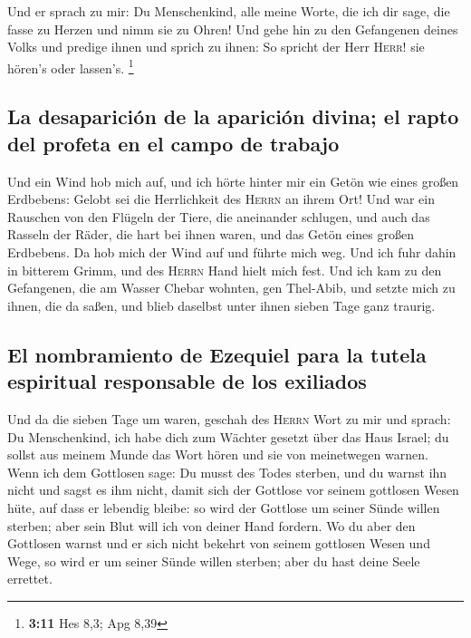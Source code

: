  Und er sprach zu mir: Du Menschenkind, alle meine Worte,
die ich dir sage, die fasse zu Herzen und nimm sie zu Ohren!
 Und gehe hin zu den Gefangenen deines Volks und predige
ihnen und sprich zu ihnen: So spricht der Herr \textsc{Herr}! sie
hören's oder lassen's. \footnote{\textbf{3:11} Hes 8,3; Apg 8,39}

\hypertarget{la-desapariciuxf3n-de-la-apariciuxf3n-divina-el-rapto-del-profeta-en-el-campo-de-trabajo}{%
\subsection{La desaparición de la aparición divina; el rapto del profeta
en el campo de
trabajo}\label{la-desapariciuxf3n-de-la-apariciuxf3n-divina-el-rapto-del-profeta-en-el-campo-de-trabajo}}

 Und ein Wind hob mich auf, und ich hörte hinter mir ein
Getön wie eines großen Erdbebens: Gelobt sei die Herrlichkeit des
\textsc{Herrn} an ihrem Ort!  Und war ein Rauschen von
den Flügeln der Tiere, die aneinander schlugen, und auch das Rasseln der
Räder, die hart bei ihnen waren, und das Getön eines großen Erdbebens.
 Da hob mich der Wind auf und führte mich weg. Und ich
fuhr dahin in bitterem Grimm, und des \textsc{Herrn} Hand hielt mich
fest.  Und ich kam zu den Gefangenen, die am Wasser
Chebar wohnten, gen Thel-Abib, und setzte mich zu ihnen, die da saßen,
und blieb daselbst unter ihnen sieben Tage ganz traurig.

\hypertarget{el-nombramiento-de-ezequiel-para-la-tutela-espiritual-responsable-de-los-exiliados}{%
\subsection{El nombramiento de Ezequiel para la tutela espiritual
responsable de los
exiliados}\label{el-nombramiento-de-ezequiel-para-la-tutela-espiritual-responsable-de-los-exiliados}}

 Und da die sieben Tage um waren, geschah des
\textsc{Herrn} Wort zu mir und sprach:  Du Menschenkind,
ich habe dich zum Wächter gesetzt über das Haus Israel; du sollst aus
meinem Munde das Wort hören und sie von meinetwegen warnen.
 Wenn ich dem Gottlosen sage: Du musst des Todes sterben,
und du warnst ihn nicht und sagst es ihm nicht, damit sich der Gottlose
vor seinem gottlosen Wesen hüte, auf dass er lebendig bleibe: so wird
der Gottlose um seiner Sünde willen sterben; aber sein Blut will ich von
deiner Hand fordern.  Wo du aber den Gottlosen warnst und
er sich nicht bekehrt von seinem gottlosen Wesen und Wege, so wird er um
seiner Sünde willen sterben; aber du hast deine Seele errettet.

